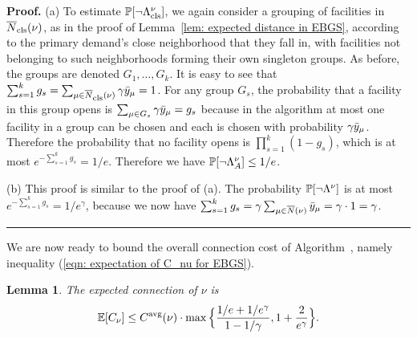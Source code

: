 \documentclass[oneside,final]{ucr}
\newtheorem{lemma}[theorem]{Lemma}
\newenvironment{proof}[1][Proof]{\textbf{#1.} }{\ \rule{0.5em}{0.5em}}
\begin{document}
\begin{proof}
  (a) To estimate $\mathbb{P}[\neg\Lambda^\nu_{{\mbox{\scriptsize\rm cls}}}]$, we again consider a
  grouping of facilities in ${\overline{N}}_{{\mbox{\scriptsize\rm cls}}}(\nu)$, as in the proof of
  Lemma~\ref{lem: expected distance in EBGS}, according to the primary
  demand's close neighborhood that they fall in, with facilities not
  belonging to such neighborhoods forming their own singleton groups.
  As before, the groups are denoted $G_1, \ldots, G_k$. It is easy to
  see that $\sum_{s=1}^k g_s = \sum_{\mu \in {\overline{N}}_{{\mbox{\scriptsize\rm cls}}}(\nu)} \gamma
  {\bar y}_{\mu} = 1$. For any group $G_s$, the probability that a
  facility in this group opens is $\sum_{\mu \in G_s} \gamma
  {\bar y}_{\mu} = g_s$ because in the algorithm at most one facility in
  a group can be chosen and each is chosen with probability $\gamma
  {\bar y}_{\mu}$. Therefore the probability that no facility 
  opens is $\prod_{s=1}^k (1 - g_s)$, which is
  at most $e^{-\sum_{s=1}^k g_s} = 1/e$. Therefore we have
  $\mathbb{P}[\neg\Lambda^\nu_A] \leq 1/e$.

(b)
  This proof is similar to the proof of (a). The probability $\mathbb{P}[\neg\Lambda^\nu]$ is at most
  $e^{-\sum_{s=1}^k g_s} = 1/e^\gamma$, because we now have
  $\sum_{s=1}^k g_s = \gamma \sum_{\mu \in {\overline{N}}(\nu)} {\bar y}_{\mu} =
  \gamma \cdot 1 = \gamma$.
\end{proof}


We are now ready to bound the overall connection cost of
Algorithm~{\EBGS}, namely inequality (\ref{eqn: expectation of C_nu for EBGS}).


\begin{lemma}\label{lem: EBGS nu's connection cost}
The expected connection of $\nu$ is
%
\begin{equation*}
\mathbb{E}[C_\nu] \le
  C^{{\mbox{\scriptsize\rm avg}}}(\nu)\cdot\max\Big\{\frac{1/e+1/e^\gamma}{1-1/\gamma}, 1+\frac{2}{e^\gamma}\Big\}.
\end{equation*}
\end{lemma}
\end{document}

